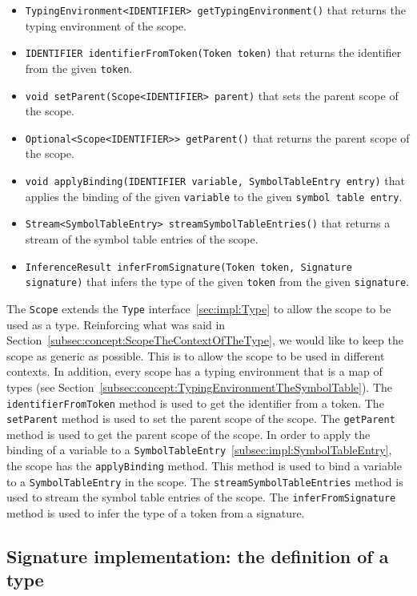 \begin{itemize}
    \item \texttt{TypingEnvironment<IDENTIFIER> getTypingEnvironment()} that returns the typing environment of the scope.
    \item \texttt{IDENTIFIER identifierFromToken(Token token)} that returns the identifier from the given \texttt{token}.
    \item \texttt{void setParent(Scope<IDENTIFIER> parent)} that sets the parent scope of the scope.
    \item \texttt{Optional<Scope<IDENTIFIER>> getParent()} that returns the parent scope of the scope.
    \item \texttt{void applyBinding(IDENTIFIER variable, SymbolTableEntry entry)} that applies the binding of the given \texttt{variable} to the given \texttt{symbol table entry}.
    \item \texttt{Stream<SymbolTableEntry> streamSymbolTableEntries()} that returns a stream of the symbol table entries of the scope.
    \item \texttt{InferenceResult inferFromSignature(Token token, Signature signature)} that infers the type of the given \texttt{token} from the given \texttt{signature}.
\end{itemize}

The \texttt{Scope} extends the \texttt{Type} interface~\ref{sec:impl:Type} to allow the scope to be used as a type. Reinforcing what was said in Section~\ref{subsec:concept:ScopeTheContextOfTheType}, we would like to keep the scope as generic as possible. This is to allow the scope to be used in different contexts. In addition, every scope has a typing environment that is a map of types (see Section~\ref{subsec:concept:TypingEnvironmentTheSymbolTable}). The \texttt{identifierFromToken} method is used to get the identifier from a token. The \texttt{setParent} method is used to set the parent scope of the scope. The \texttt{getParent} method is used to get the parent scope of the scope.
In order to apply the binding of a variable to a \texttt{SymbolTableEntry}~\ref{subsec:impl:SymbolTableEntry}, the scope has the \texttt{applyBinding} method. This method is used to bind a variable to a \texttt{SymbolTableEntry} in the scope. The \texttt{streamSymbolTableEntries} method is used to stream the symbol table entries of the scope. The \texttt{inferFromSignature} method is used to infer the type of a token from a signature.

\subsection{Signature implementation: the definition of a type}\label{subsec:impl:Signature}

